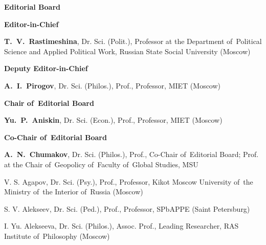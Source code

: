
\begin{otherlanguage}{english}

\vspace*{-4em}

    \begin{center}
        \textbf{Editorial Board}
    \end{center}
    
    
    
    \begin{multicols}{2}
       \begin{flushleft}
            
        \scriptsize
    
        \begin{center}
        \textbf{Editor-in-Chief}
        \end{center}
    
\noindent\textbf{T. V. Rastimeshina}, Dr. Sci. (Polit.), Professor at the Department of Political Science and Applied Political Work, Russian State Social University (Moscow)
    
        \begin{center}
        \textbf{Deputy Editor-in-Chief}
        \end{center}
    
\noindent  \textbf{A. I. Pirogov}, Dr. Sci. (Philos.), Prof., Professor, MIET (Moscow)

\begin{center}
    \textbf{Chair of Editorial Board}
    \end{center}

\noindent \textbf{Yu. P. Aniskin}, Dr. Sci. (Econ.), Prof., Professor, MIET (Moscow)

\begin{center}
    \textbf{Co-Chair of Editorial Board}
    \end{center}

\noindent \textbf{A. N. Chumakov}, Dr. Sci. (Philos.), Prof., Co-Chair of Editorial Board; Prof. at the Chair of Geopolicy of Faculty of Global Studies, MSU

\vspace{2em}
\noindent V. S. Agapov, Dr. Sci. (Psy.), Prof., Professor, Kikot Moscow University of the Ministry of the Interior of Russia (Moscow)

\noindent S. V. Alekseev, Dr. Sci. (Ped.), Prof., Professor, SPbAPPE (Saint Petersburg)

\noindent I. Yu. Alekseeva, Dr. Sci. (Philos.), Assoc. Prof., Leading Researcher, RAS Institute of Philosophy (Moscow)


\end{flushleft}
\end{multicols}
\end{otherlanguage}
